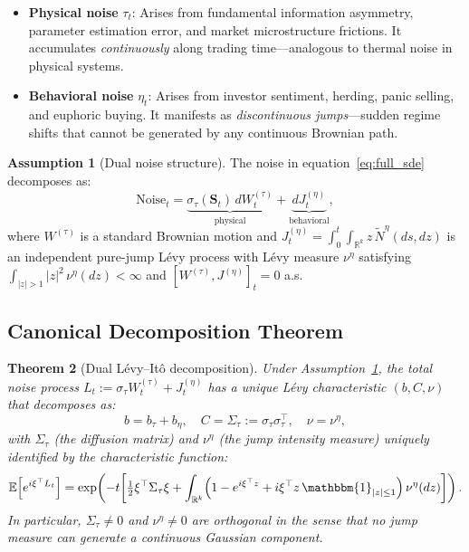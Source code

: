 \documentclass[12pt,a4paper]{article}
\theoremstyle{plain}
\newtheorem{theorem}{Theorem}[section]
\theoremstyle{definition}
\newtheorem{assumption}[theorem]{Assumption}
\newcommand{\R}{\mathbb{R}}
\newcommand{\E}{\mathbb{E}}
\newcommand{\1}{\mathbbm{1}}
\begin{document}
\begin{itemize}
\item \textbf{Physical noise} $\tau_t$: Arises from fundamental information
  asymmetry, parameter estimation error, and market microstructure frictions.
  It accumulates \emph{continuously} along trading time—analogous to thermal
  noise in physical systems.

\item \textbf{Behavioral noise} $\eta_t$: Arises from investor sentiment,
  herding, panic selling, and euphoric buying. It manifests as
  \emph{discontinuous jumps}—sudden regime shifts that cannot be generated by
  any continuous Brownian path.
\end{itemize}

\begin{assumption}[Dual noise structure]
\label{ass:dual_noise}
The noise in equation~\eqref{eq:full_sde} decomposes as:
\begin{equation}
\label{eq:dual_noise}
\text{Noise}_t = \underbrace{\sigma_\tau(\mathbf{S}_t)\,dW_t^{(\tau)}}_{\text{physical}} + \underbrace{dJ_t^{(\eta)}}_{\text{behavioral}},
\end{equation}
where $W^{(\tau)}$ is a standard Brownian motion and
$J^{(\eta)}_t = \int_0^t\!\int_{\R^k} z\,\tilde{N}^\eta(ds,dz)$ is an
independent pure-jump Lévy process with Lévy measure $\nu^\eta$ satisfying
$\int_{|z|>1}|z|^2\,\nu^\eta(dz) < \infty$ and
$[W^{(\tau)}, J^{(\eta)}]_t = 0$ a.s.
\end{assumption}

\subsection{Canonical Decomposition Theorem}

\begin{theorem}[Dual Lévy--Itô decomposition]
\label{thm:noise_decomp}
Under Assumption~\ref{ass:dual_noise}, the total noise process $L_t :=
\sigma_\tau W_t^{(\tau)} + J_t^{(\eta)}$ has a unique Lévy characteristic
$(b, C, \nu)$ that decomposes as:
\begin{equation}
\label{eq:levy_char_decomp}
b = b_\tau + b_\eta, \quad
C = \Sigma_\tau := \sigma_\tau\sigma_\tau^\top, \quad
\nu = \nu^\eta,
\end{equation}
with $\Sigma_\tau$ (the diffusion matrix) and $\nu^\eta$ (the jump intensity
measure) \emph{uniquely identified} by the characteristic function:
\begin{equation}
\label{eq:char_fn}
\E\!\left[e^{i\xi^\top L_t}\right]
= \exp\!\left(-t\!\left[
    \tfrac{1}{2}\xi^\top\Sigma_\tau\xi
    + \int_{\R^k}\!\left(1 - e^{i\xi^\top z} + i\xi^\top z\,\1_{|z|\leq1}\right)
      \nu^\eta(dz)
  \right]\right).
\end{equation}
In particular, $\Sigma_\tau \neq 0$ and $\nu^\eta \neq 0$ are \emph{orthogonal}
in the sense that no jump measure can generate a continuous Gaussian component.
\end{theorem}
\end{document}
